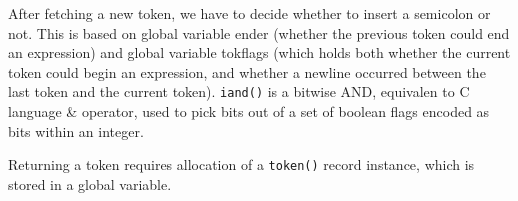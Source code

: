 
After fetching a new token, we have to decide whether to insert a
semicolon or not. This is based on global variable ender (whether the
previous token could end an expression) and global variable tokflags
(which holds both whether the current token could begin an expression,
and whether a newline occurred between the last token and the current
token).  \texttt{iand()} is a bitwise AND, equivalen to C language \&
operator, used to pick bits out of a set of boolean flags encoded as
bits within an integer.


Returning a token requires allocation of a \texttt{token()} record
instance, which is stored in a global variable.

